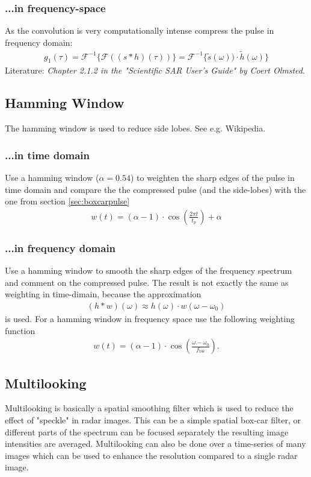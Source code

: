 \subsubsection{...in frequency-space}
 As the convolution is very computationally intense compress the pulse in frequency domain:
\begin{align}
g_1(\tau) = \mathcal{F}^{-1}\Big\{\mathcal{F}\left((s*h)(\tau)\right)\Big\} = \mathcal{F}^{-1}\Big\{\tilde{s}(\omega))\cdot \tilde{h}(\omega)\Big\}
\end{align}
Literature: \textit{Chapter 2.1.2 in the "Scientific SAR User's Guide" by Coert Olmsted}.


\subsection{Hamming Window}
The hamming window is used to reduce side lobes. See e.g. Wikipedia. 

\subsubsection{...in time domain}
Use a hamming window ($\alpha = 0.54$) to weighten the sharp edges of the pulse in time domain and compare the the compressed pulse (and the side-lobes) with the one from section \ref{sec:boxcarpulse}
\begin{align}
w(t) = (\alpha-1)\cdot\cos(\frac{2\pi t}{t_p}) + \alpha
\end{align}

\subsubsection{...in frequency domain}
Use a hamming window to smooth the sharp edges of the frequency spectrum and comment on the compressed pulse. The result is not exactly the same as weighting in time-dimain, because the approximation
\begin{align}
(h*w)(\omega) \approx h(\omega)\cdot w(\omega-\omega_0)
\end{align}
is used. For a hamming window in frequency space use the following weighting function
\begin{align}
w(t) = (\alpha-1)\cdot\cos(\frac{\omega - \omega_0}{f_{\text{bw}}}).
\end{align}

\subsection{Multilooking}
Multilooking is basically a spatial smoothing filter which is used to reduce the effect of "{}speckle"{} in radar images. This can be a simple spatial box-car filter, or different parts of the spectrum can be focused separately the resulting image intensities are averaged. Multilooking can also be done over a time-series of many images which can be used to enhance the resolution compared to a single radar image.

